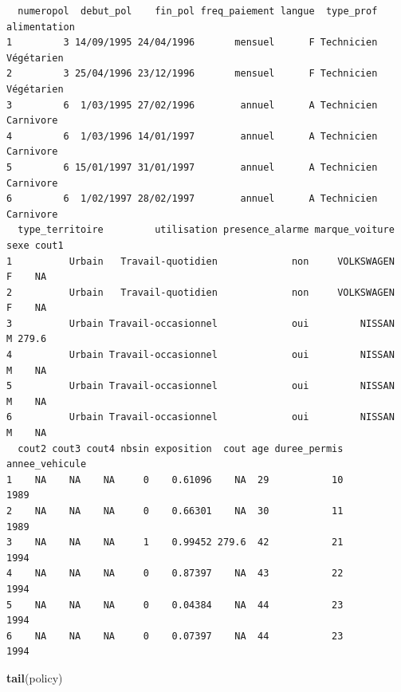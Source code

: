 \documentclass[
]{book}
\newenvironment{Shaded}{\begin{snugshade}}{\end{snugshade}}
\newcommand{\KeywordTok}[1]{\textcolor[rgb]{0.13,0.29,0.53}{\textbf{#1}}}
\newcommand{\NormalTok}[1]{#1}
\begin{document}
\begin{verbatim}
  numeropol  debut_pol    fin_pol freq_paiement langue  type_prof alimentation
1         3 14/09/1995 24/04/1996       mensuel      F Technicien   Végétarien
2         3 25/04/1996 23/12/1996       mensuel      F Technicien   Végétarien
3         6  1/03/1995 27/02/1996        annuel      A Technicien    Carnivore
4         6  1/03/1996 14/01/1997        annuel      A Technicien    Carnivore
5         6 15/01/1997 31/01/1997        annuel      A Technicien    Carnivore
6         6  1/02/1997 28/02/1997        annuel      A Technicien    Carnivore
  type_territoire         utilisation presence_alarme marque_voiture sexe cout1
1          Urbain   Travail-quotidien             non     VOLKSWAGEN    F    NA
2          Urbain   Travail-quotidien             non     VOLKSWAGEN    F    NA
3          Urbain Travail-occasionnel             oui         NISSAN    M 279.6
4          Urbain Travail-occasionnel             oui         NISSAN    M    NA
5          Urbain Travail-occasionnel             oui         NISSAN    M    NA
6          Urbain Travail-occasionnel             oui         NISSAN    M    NA
  cout2 cout3 cout4 nbsin exposition  cout age duree_permis annee_vehicule
1    NA    NA    NA     0    0.61096    NA  29           10           1989
2    NA    NA    NA     0    0.66301    NA  30           11           1989
3    NA    NA    NA     1    0.99452 279.6  42           21           1994
4    NA    NA    NA     0    0.87397    NA  43           22           1994
5    NA    NA    NA     0    0.04384    NA  44           23           1994
6    NA    NA    NA     0    0.07397    NA  44           23           1994
\end{verbatim}

\begin{Shaded}
\begin{Highlighting}[]
\KeywordTok{tail}\NormalTok{(policy)}
\end{Highlighting}
\end{Shaded}
\end{document}
